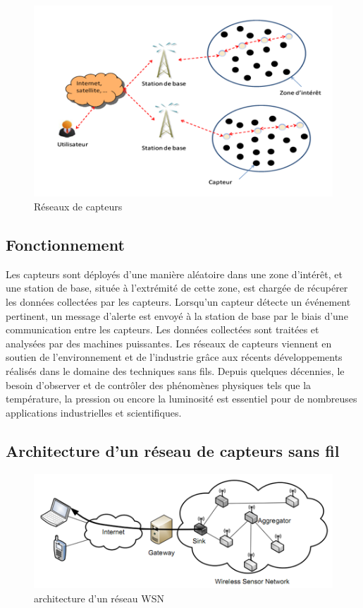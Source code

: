 \begin{figure}[h]
\centering
\includegraphics[scale=0.8]{intro/WSN}
\caption{\label{WSN} Réseaux de capteurs}
\end{figure}


\subsection{Fonctionnement}
Les capteurs sont déployés d’une manière aléatoire dans une zone d’intérêt, et une station de base, située à l’extrémité de cette zone, est chargée de récupérer les données collectées par les capteurs. Lorsqu’un capteur détecte un événement pertinent, un message d’alerte est envoyé à la station de base par le biais d’une  communication entre les capteurs. Les données collectées sont traitées et analysées par des machines puissantes. Les  réseaux de capteurs viennent  en  soutien  de l’environnement et de l’industrie grâce aux récents développements réalisés dans le domaine  des techniques sans  fils.  Depuis  quelques décennies, le besoin d’observer et de contrôler des phénomènes physiques tels que la température, la pression ou encore la  luminosité  est essentiel pour de nombreuses applications industrielles et scientifiques.


\subsection{Architecture d’un réseau de capteurs sans fil}

\begin{figure}[h]
\centering
\includegraphics[scale=0.8]{intro/archiWSN}
\caption{\label{archiWSN} architecture d’un réseau WSN}
\end{figure}

